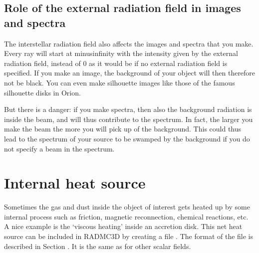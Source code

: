 \documentclass[letterpaper,10pt,english]{sphinxmanual}
\begin{document}
\subsection{Role of the external radiation field in images and spectra}
\label{\detokenize{stars:role-of-the-external-radiation-field-in-images-and-spectra}}
The interstellar radiation field also affects the images and spectra that
you make. Every ray will start at minus\sphinxhyphen{}infinity with the intensity given by
the external radiation field, instead of 0 as it would be if no external
radiation field is specified. If you make an image, the background of your
object will then therefore not be black. You can even make silhouette images
like those of the famous silhouette disks in Orion.

But there is a danger: if you make spectra, then also the background
radiation is inside the beam, and will thus contribute to the spectrum.
In fact, the larger you make the beam the more you will pick up of the
background. This could thus lead to the spectrum of your source to be
swamped by the background if you do not specify a beam in the spectrum.


\section{Internal heat source}
\label{\detokenize{stars:internal-heat-source}}\label{\detokenize{stars:sec-internal-source}}
Sometimes the gas and dust inside the object of interest gets heated up by
some internal process such as friction, magnetic reconnection, chemical
reactions, etc. A nice example is the ‘viscous heating’ inside an
accretion disk. This net heat source can be included in RADMC\sphinxhyphen{}3D by creating
a file . The format of the file is described in
Section {\hyperref[\detokenize{inputoutputfiles:sec-heatsource}]{}}. It is the same as for other scalar fields.
\end{document}
